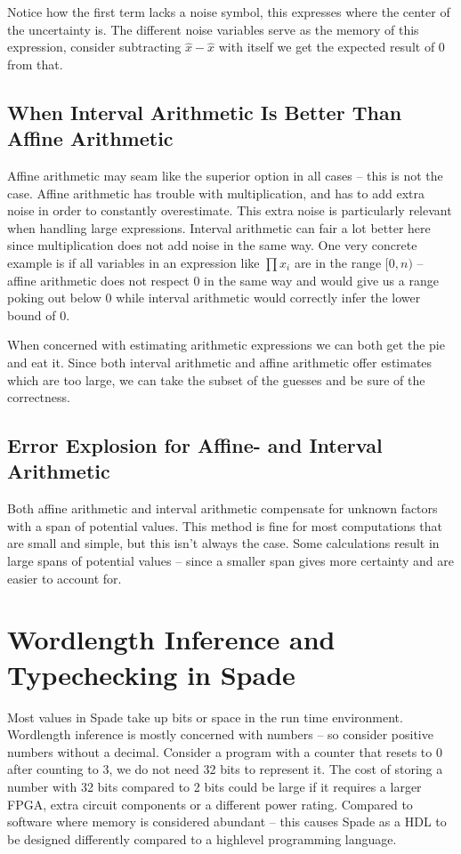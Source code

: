 Notice how the first term lacks a noise symbol, this expresses where the center of the uncertainty is. The different noise variables serve as the memory of this expression, consider subtracting $\hat{x} - \hat{x}$ with itself we get the expected result of 0 from that.

\subsection{When Interval Arithmetic Is Better Than Affine Arithmetic}
Affine arithmetic may seam like the superior option in all cases -- this is not the case. Affine arithmetic has trouble with multiplication, and has to add extra noise in order to constantly overestimate. This extra noise is particularly relevant when handling large expressions. Interval arithmetic can fair a lot better here since multiplication does not add noise in the same way. One very concrete example is if all variables in an expression like $\prod x_i$ are in the range $[0,n)$ -- affine arithmetic does not respect $0$ in the same way and would give us a range poking out below $0$ while interval arithmetic would correctly infer the lower bound of $0$.

When concerned with estimating arithmetic expressions we can both get the pie and eat it. Since both interval arithmetic and affine arithmetic offer estimates which are too large, we can take the subset of the guesses and be sure of the correctness.

\subsection{Error Explosion for Affine- and Interval Arithmetic}
\label{sec:ee}
Both affine arithmetic and interval arithmetic compensate for unknown factors with a span of potential values. This method is fine for most computations that are small and simple, but this isn't always the case. Some calculations result in large spans of potential values -- since a smaller span gives more certainty and are easier to account for.
\cite{src:affAri}

\section{Wordlength Inference and Typechecking in Spade}
\label{sec:TheProblem}
Most values in Spade take up bits or space in the run time environment. Wordlength inference is mostly concerned with numbers -- so consider positive numbers without a decimal. Consider a program with a counter that resets to 0 after counting to 3, we do not need 32 bits to represent it. The cost of storing a number with 32 bits compared to 2 bits could be large if it requires a larger FPGA, extra circuit components or a different power rating. Compared to software where memory is considered abundant -- this causes Spade as a HDL to be designed differently compared to a highlevel programming language.

